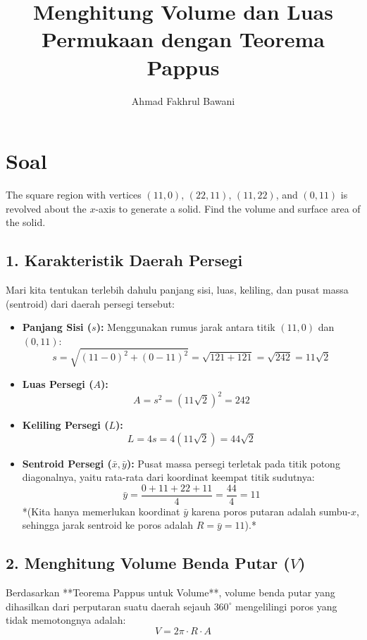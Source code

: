 \documentclass[12pt,a4paper]{article}
\title{Menghitung Volume dan Luas Permukaan dengan Teorema Pappus}
\author{Ahmad Fakhrul Bawani}
\date{}
\begin{document}
\maketitle

\section*{Soal}

The square region with vertices $(11,0)$, $(22,11)$, $(11,22)$, and $(0,11)$ is revolved about the $x$-axis to generate a solid. Find the volume and surface area of the solid.

\subsection*{1. Karakteristik Daerah Persegi}
Mari kita tentukan terlebih dahulu panjang sisi, luas, keliling, dan pusat massa (sentroid) dari daerah persegi tersebut:
\begin{itemize}
  \item \textbf{Panjang Sisi ($s$):}
    Menggunakan rumus jarak antara titik $(11,0)$ dan $(0,11)$:
    \begin{equation*}
      s = \sqrt{(11 - 0)^2 + (0 - 11)^2} = \sqrt{121 + 121} = \sqrt{242} = 11\sqrt{2}
    \end{equation*}
  \item \textbf{Luas Persegi ($A$):}
    \begin{equation*}
      A = s^2 = (11\sqrt{2})^2 = 242
    \end{equation*}
  \item \textbf{Keliling Persegi ($L$):}
    \begin{equation*}
      L = 4s = 4(11\sqrt{2}) = 44\sqrt{2}
    \end{equation*}
  \item \textbf{Sentroid Persegi ($\bar{x}, \bar{y}$):}
    Pusat massa persegi terletak pada titik potong diagonalnya, yaitu rata-rata dari koordinat keempat titik sudutnya:
    \begin{equation*}
      \bar{y} = \frac{0 + 11 + 22 + 11}{4} = \frac{44}{4} = 11
    \end{equation*}
    *(Kita hanya memerlukan koordinat $\bar{y}$ karena poros putaran adalah sumbu-$x$, sehingga jarak sentroid ke poros adalah $R = \bar{y} = 11$).*
\end{itemize}

\subsection*{2. Menghitung Volume Benda Putar ($V$)}
Berdasarkan **Teorema Pappus untuk Volume**, volume benda putar yang dihasilkan dari perputaran suatu daerah sejauh $360^\circ$ mengelilingi poros yang tidak memotongnya adalah:
\begin{equation*}
  V = 2\pi \cdot R \cdot A
\end{equation*}
\end{document}
